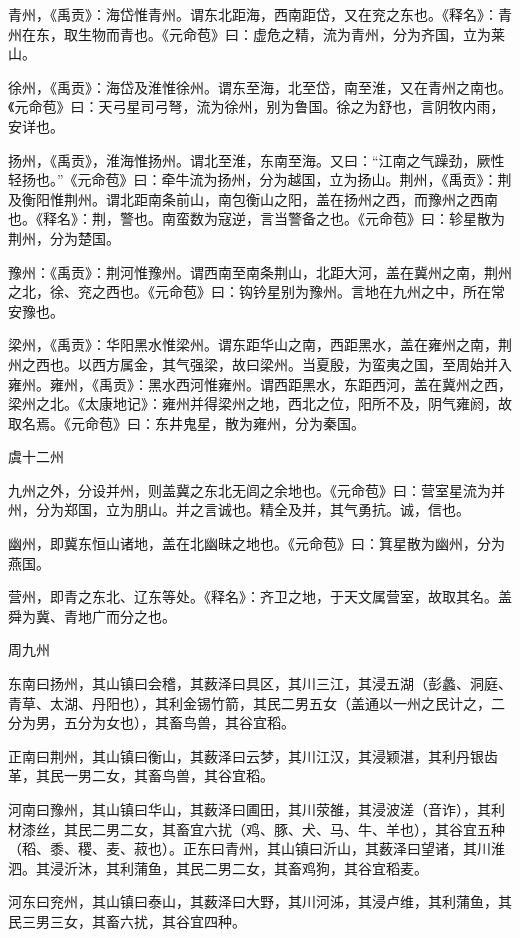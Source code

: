 \documentclass[a4paper,12pt,UTF8,twoside]{ctexbook}
\begin{document}
	青州，《禹贡》：海岱惟青州。谓东北距海，西南距岱，又在兖之东也。《释名》：青州在东，取生物而青也。《元命苞》曰：虚危之精，流为青州，分为齐国，立为莱山。
	
	徐州，《禹贡》：海岱及淮惟徐州。谓东至海，北至岱，南至淮，又在青州之南也。《元命苞》曰：天弓星司弓弩，流为徐州，别为鲁国。徐之为舒也，言阴牧内雨，安详也。
	
	扬州，《禹贡》，淮海惟扬州。谓北至淮，东南至海。又曰：“江南之气躁劲，厥性轻扬也。”《元命苞》曰：牵牛流为扬州，分为越国，立为扬山。荆州，《禹贡》：荆及衡阳惟荆州。谓北距南条前山，南包衡山之阳，盖在扬州之西，而豫州之西南也。《释名》：荆，警也。南蛮数为寇逆，言当警备之也。《元命苞》曰：轸星散为荆州，分为楚国。
	
	豫州：《禹贡》：荆河惟豫州。谓西南至南条荆山，北距大河，盖在冀州之南，荆州之北，徐、兖之西也。《元命苞》曰：钩钤星别为豫州。言地在九州之中，所在常安豫也。
	
	梁州，《禹贡》：华阳黑水惟梁州。谓东距华山之南，西距黑水，盖在雍州之南，荆州之西也。以西方属金，其气强梁，故曰梁州。当夏殷，为蛮夷之国，至周始并入雍州。雍州，《禹贡》：黑水西河惟雍州。谓西距黑水，东距西河，盖在冀州之西，梁州之北。《太康地记》：雍州并得梁州之地，西北之位，阳所不及，阴气雍阏，故取名焉。《元命苞》曰：东井鬼星，散为雍州，分为秦国。
	
	虞十二州
	
	九州之外，分设并州，则盖冀之东北无闾之余地也。《元命苞》曰：营室星流为并州，分为郑国，立为朋山。并之言诚也。精全及并，其气勇抗。诚，信也。
	
	幽州，即冀东恒山诸地，盖在北幽昧之地也。《元命苞》曰：箕星散为幽州，分为燕国。
	
	营州，即青之东北、辽东等处。《释名》：齐卫之地，于天文属营室，故取其名。盖舜为冀、青地广而分之也。
	
	周九州
	
	东南曰扬州，其山镇曰会稽，其薮泽曰具区，其川三江，其浸五湖（彭蠡、洞庭、青草、太湖、丹阳也），其利金锡竹箭，其民二男五女（盖通以一州之民计之，二分为男，五分为女也），其畜鸟兽，其谷宜稻。
	
	正南曰荆州，其山镇曰衡山，其薮泽曰云梦，其川江汉，其浸颖湛，其利丹银齿革，其民一男二女，其畜鸟兽，其谷宜稻。
	
	河南曰豫州，其山镇曰华山，其薮泽曰圃田，其川荥雒，其浸波溠（音诈），其利材漆丝，其民二男二女，其畜宜六扰（鸡、豚、犬、马、牛、羊也），其谷宜五种（稻、黍、稷、麦、菽也）。正东曰青州，其山镇曰沂山，其薮泽曰望诸，其川淮泗。其浸沂沐，其利蒲鱼，其民二男二女，其畜鸡狗，其谷宜稻麦。
	
	河东曰兖州，其山镇曰泰山，其薮泽曰大野，其川河泲，其浸卢维，其利蒲鱼，其民三男三女，其畜六扰，其谷宜四种。
	
\end{document}
